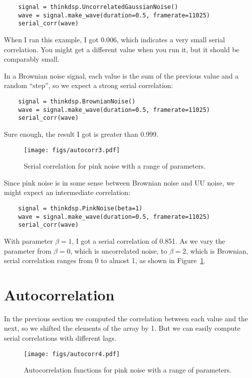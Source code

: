 \begin{verbatim}
	signal = thinkdsp.UncorrelatedGaussianNoise()
	wave = signal.make_wave(duration=0.5, framerate=11025)
	serial_corr(wave)
\end{verbatim}

When I ran this example, I got 0.006, which indicates a very
small serial correlation.  You might get a different value when you run
it, but it should be comparably small.

In a Brownian noise signal, each value is the sum of the previous
value and a random ``step'', so we expect a strong serial
correlation:

\begin{verbatim}
	signal = thinkdsp.BrownianNoise()
	wave = signal.make_wave(duration=0.5, framerate=11025)
	serial_corr(wave)
\end{verbatim}

Sure enough, the result I got is greater than 0.999.

\begin{figure}
	\centerline{\texttt{[image: figs/autocorr3.pdf]}}
	\caption{Serial correlation for pink noise with a range of
		parameters.}
	\label{fig.autocorr3}
\end{figure}

Since pink noise is in some sense between Brownian noise and UU noise,
we might expect an intermediate correlation:

\begin{verbatim}
	signal = thinkdsp.PinkNoise(beta=1)
	wave = signal.make_wave(duration=0.5, framerate=11025)
	serial_corr(wave)
\end{verbatim}

With parameter $\beta=1$, I got a serial correlation of 0.851.
As we vary the parameter from $\beta=0$, which is uncorrelated
noise, to $\beta=2$, which is Brownian, serial correlation
ranges from 0 to almost 1, as shown in Figure~\ref{fig.autocorr3}.


\section{Autocorrelation}
\label{autopink}

In the previous section we computed the correlation between each
value and the next, so we shifted the elements of the array by 1.
But we can easily compute serial correlations with
different lags.

\begin{figure}
	\centerline{\texttt{[image: figs/autocorr4.pdf]}}
	\caption{Autocorrelation functions for pink noise with a range
		of parameters.}
	\label{fig.autocorr4}
\end{figure}

